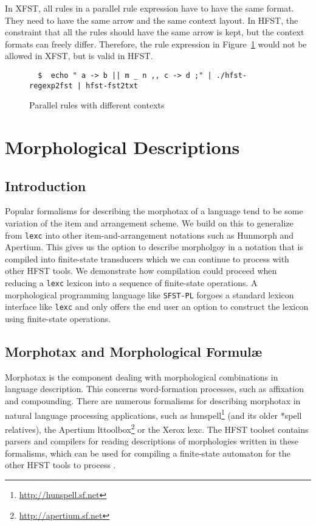 \documentclass{llncs}
\begin{document}
In XFST, all rules in a parallel rule expression have to have the same format. 
They need to have the same arrow and the same context layout. 
In HFST, the constraint that all the rules should have the same arrow is kept, 
but the context formats can freely differ. 
Therefore, the rule expression in Figure~\ref{fig:parallel_rules} 
would not be allowed in XFST, but is valid in HFST.
\begin{figure}
{\scriptsize
\begin{verbatim}
  $  echo " a -> b || m _ n ,, c -> d ;" | ./hfst-regexp2fst | hfst-fst2txt
\end{verbatim}
}
\caption{Parallel rules with different contexts}
\label{fig:parallel_rules}
\end{figure}

\section{Morphological Descriptions}\label{MorphTools}

\subsection{Introduction}

Popular formalisms for describing the morphotax of a language tend to be some variation 
of the item and arrangement scheme. We build on this to generalize from \verb!lexc! into other
item-and-arrangement notations such as Hunmorph and Apertium. This gives us the option to describe 
morpholgoy in a notation that is compiled into finite-state transducers which we can continue to process with other
HFST tools. We demonstrate how compilation could proceed when reducing a \verb!lexc! lexicon into a sequence of
finite-state operations. A morphological programming language like \verb!SFST-PL! forgoes a standard lexicon interface
like \verb!lexc! and only offers the end user an option to construct the lexicon using finite-state operations.

\subsection{Morphotax and Morphological Formul\ae}

Morphotax is the component dealing with morphological combinations
in language description. This concerns word-formation processes, such as affixation and compounding. 
There are numerous formalisms for describing morphotax in natural language processing applications, 
such as hunspell\footnote{\url{http://hunspell.sf.net}} (and its older *spell relatives),
the Apertium lttoolbox\footnote{\url{http://apertium.sf.net}}
or the Xerox lexc\cite{beesley/2003}. The HFST toolset contains parsers and compilers 
for reading descriptions of morphologies written in these formalisms, which can be used for 
compiling a finite-state automaton for the other HFST tools to process 
\cite{pirinen/2010/il,linden/2009/sfcm}.
\end{document}

